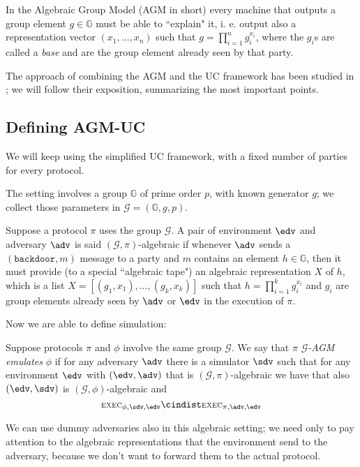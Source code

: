 In the Algebraic Group Model (AGM in short) every machine that outputs a group element $g\in\mathbb G$ must be able to ``explain" it, i. e. output also a representation vector $(x_1,\dots,x_n)$ such that $g=\prod_{i=1}^n g_i^{x_i}$, where the $g_i$s are called a \emph{base} and are the group element already seen by that party.

The approach of combining the AGM and the UC framework has been studied in \cite{AGM_UC}; we will follow their exposition, summarizing the most important points.

\subsection{Defining AGM-UC}

We will keep using the simplified UC framework, with a fixed number of parties for every protocol.

The setting involves a group $\mathbb G$ of prime order $p$, with known generator $g$; we collect those parameters in $\mathcal G=(\mathbb G, g, p)$.

\begin{definition}
    Suppose a protocol $\pi$ uses the group $\mathcal G$. A pair of environment $\edv$ and adversary $\adv$ is said $(\mathcal G,\pi)$-algebraic if whenever $\adv$ sends a $(\texttt{backdoor}, m)$ message to a party and $m$ contains an element $h\in\mathbb G$, then it must provide (to a special ``algebraic tape") an algebraic representation $X$ of $h$, which is a list $X=[(g_1,x_1),\dots,(g_k,x_k)]$ such that $h=\prod_{i=1}^kg_i^{x_i}$ and $g_i$ are group elements already seen by $\adv$ or $\edv$ in the execution of $\pi$.
\end{definition}

Now we are able to define simulation:

\begin{definition}
    Suppose protocols $\pi$ and $\phi$ involve the same group $\mathcal G$. We say that $\pi$ \emph{$\mathcal G$-AGM emulates} $\phi$ if for any adversary $\adv$ there is a simulator $\sdv$ such that for any environment $\edv$ with $(\edv,\adv)$ that is $(\mathcal G, \pi)$-algebraic we have that also $(\edv,\sdv)$ is $(\mathcal G, \phi)$-algebraic and
    $$\textsc{\scriptsize EXEC}_{\phi,\sdv,\edv} \cindist \textsc{\scriptsize EXEC}_{\pi,\adv,\edv}$$
\end{definition}

We can use dummy adversaries also in this algebraic setting; we need only to pay attention to the algebraic representations that the environment send to the adversary, because we don't want to forward them to the actual protocol.

